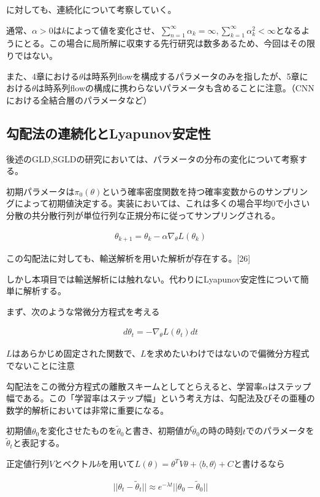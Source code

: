 \documentclass{jsarticle}
\begin{document}
に対しても、連続化について考察していく。

通常、$\alpha>0$は$k$によって値を変化させ、$\sum^\infty_{n=1}\alpha_k=\infty,\sum^\infty_{k=1}\alpha^2_k<\infty$となるようにとる。この場合に局所解に収束する先行研究は数多あるため、今回はその限りではない。

また、4章における$\theta$は時系列flowを構成するパラメータのみを指したが、5章における$\theta$は時系列flowの構成に携わらないパラメータも含めることに注意。（CNNにおける全結合層のパラメータなど）

\subsection{勾配法の連続化とLyapunov安定性}

後述のGLD,SGLDの研究においては、パラメータの分布の変化について考察する。

初期パラメータは$\pi_0(\theta)$という確率密度関数を持つ確率変数からのサンプリングによって初期値決定する。実装においては、これは多くの場合平均0で小さい分散の共分散行列が単位行列な正規分布に従ってサンプリングされる。

\begin{align}
\theta_{k+1}=\theta_k-\alpha\nabla_\theta L(\theta_k)
\end{align}


この勾配法に対しても、輸送解析を用いた解析が存在する。[26]

しかし本項目では輸送解析には触れない。代わりにLyapunov安定性について簡単に解析する。

まず、次のような常微分方程式を考える

\begin{align}
d\theta_t=-\nabla_\theta L(\theta_t)dt
\end{align}

$L$はあらかじめ固定された関数で、$L$を求めたいわけではないので偏微分方程式でないことに注意

勾配法をこの微分方程式の離散スキームとしてとらえると、学習率$\alpha$はステップ幅である。この「学習率はステップ幅」という考え方は、勾配法及びその亜種の数学的解析においては非常に重要になる。

初期値$\theta_0$を変化させたものを$\tilde{\theta}_0$と書き、初期値が$\tilde{\theta}_0$の時の時刻$t$でのパラメータを$\tilde{\theta}_t$と表記する。

正定値行列$V$とベクトル$b$を用いて$L(\theta)=\theta^TV\theta+\langle b,\theta\rangle+C$と書けるなら

\begin{align}
||\theta_t-\tilde{\theta}_t||\approx e^{-\lambda t}||\theta_0-\tilde{\theta}_0||
\end{align}
\end{document}
